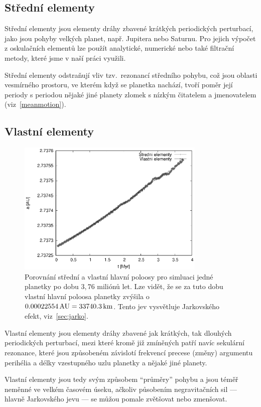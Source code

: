\documentclass[A4paper, 12pt, oneside]{book}
\begin{document}
\subsection{Střední elementy}
Střední elementy jsou elementy dráhy zbavené krátkých periodických perturbací, jako jsou pohyby velkých planet, např. Jupitera nebo Saturnu. Pro jejich výpočet z oskulačních elementů lze použít analytické, numerické nebo také filtrační metody, které jsme v naší práci využili. 

Střední elementy odstraňují vliv tzv.\ rezonancí středního pohybu, což jsou oblasti vesmírného prostoru, ve kterém když se planetka nachází, tvoří poměr její periody s periodou nějaké jiné planety zlomek s nízkým čitatelem a jmenovatelem (viz~\ref{meanmotion}). 
\subsection{Vlastní elementy}

\begin{figure}[!htb]
	\centering
	\includegraphics[width=0.8\textwidth]{obr/atFP}
	\caption{Porovnání střední a vlastní hlavní poloosy pro simluaci jedné planetky po dobu $3,76$ miliónů let. Lze vidět, že se za tuto dobu vlastní hlavní poloosa planetky zvýšila o $0.00022554\,{\rm AU}=33740.3\, {\rm km}$. Tento jev vysvětluje Jarkovského efekt, viz~\ref{sec:jarko}.}
	\label{atFP}
\end{figure}

Vlastní elementy jsou elementy dráhy zbavené jak krátkých, tak dlouhých periodických perturbací, mezi které kromě již zmíněných patří navíc sekulární rezonance, které jsou způsobeném závislotí frekvencí precese (změny) argumentu perihélia a délky vzestupného uzlu planetky a nějaké jiné planety. 

Vlastní elementy jsou tedy svým způsobem \enquote{průměry} pohybu a jsou téměř neměnné ve velkém časovém úseku, ačkoliv působením negravitačních sil --- hlavně Jarkovského jevu --- se můžou pomale zvětšovat nebo zmenšovat. 
\end{document}
